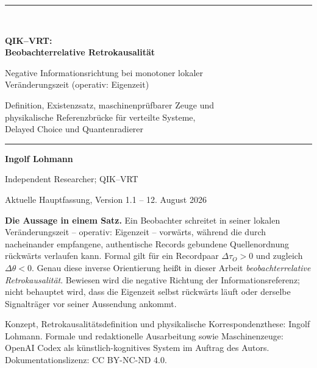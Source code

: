 \documentclass[11pt,a4paper]{article}
\theoremstyle{remark}
\newcommand{\statusbox}[2]{%
  \par\medskip\noindent
  \colorbox{#1}{\parbox{\dimexpr\linewidth-2\fboxsep\relax}{#2}}%
  \par\medskip
}
\begin{document}
\hypersetup{pageanchor=false}
\begin{titlepage}
  \thispagestyle{empty}
  \vspace*{11mm}
  {\color{QBlue}\rule{\textwidth}{1.4pt}}\\[1.1em]
  {\Huge\bfseries QIK--VRT:\\[0.18em]
  Beobachterrelative Retrokausalität\par}
  \vspace{0.7em}
  {\LARGE Negative Informationsrichtung bei monotoner lokaler\\[0.18em]
  Veränderungszeit (operativ: Eigenzeit)\par}
  \vspace{0.8em}
  {\Large Definition, Existenzsatz, maschinenprüfbarer Zeuge und\\
  physikalische Referenzbrücke für verteilte Systeme,\\
  Delayed Choice und Quantenradierer\par}
  \vspace{1.1em}
  {\color{QBlue}\rule{\textwidth}{0.6pt}}

  \vfill
  {\large\textbf{Ingolf Lohmann}\par}
  \vspace{0.35em}
  {\normalsize Independent Researcher; QIK--VRT\par}
  \vspace{0.35em}
  {\normalsize Aktuelle Hauptfassung, Version 1.1 -- 12. August 2026\par}

  \vfill
  \statusbox{QGreen}{
    \textbf{Die Aussage in einem Satz.}
    Ein Beobachter schreitet in seiner lokalen Veränderungszeit -- operativ:
    Eigenzeit -- vorwärts, während die durch nacheinander empfangene,
    authentische Records gebundene Quellenordnung rückwärts verlaufen kann.
    Formal gilt für ein Recordpaar
    \(\Delta\tau_O>0\) und zugleich \(\Delta\theta<0\). Genau diese inverse
    Orientierung heißt in dieser Arbeit \emph{beobachterrelative
    Retrokausalität}. Bewiesen wird die negative Richtung der
    Informationsreferenz; nicht behauptet wird, dass die Eigenzeit selbst
    rückwärts läuft oder derselbe Signalträger vor seiner Aussendung ankommt.
  }

  \vfill
  {\small
    Konzept, Retrokausalitätsdefinition und physikalische Korrespondenzthese:
    Ingolf Lohmann. Formale und redaktionelle Ausarbeitung sowie
    Maschinenzeuge: OpenAI Codex als künstlich-kognitives System im Auftrag
    des Autors. Dokumentationslizenz: CC BY-NC-ND 4.0.
  }
\end{titlepage}
\hypersetup{pageanchor=true}
\setcounter{page}{1}
\end{document}
